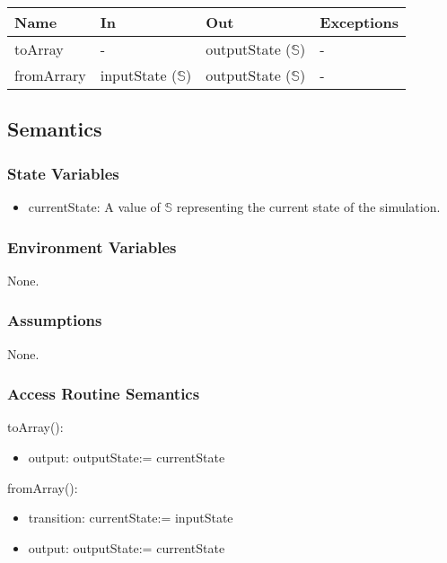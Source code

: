 \documentclass[12pt, titlepage]{article}
\begin{document}
\begin{center}
\begin{tabular}{p{2cm} p{4cm} p{4cm} p{2cm}}
\hline
\textbf{Name} & \textbf{In} & \textbf{Out} & \textbf{Exceptions} \\
\hline
toArray & - & outputState ($\mathbb{S}$) & - \\
fromArrary & inputState ($\mathbb{S}$) & outputState ($\mathbb{S}$) & - \\
\hline
\end{tabular}
\end{center}

\subsection{Semantics}

\subsubsection{State Variables}

\begin{itemize}
  \item currentState: A value of $\mathbb{S}$ representing the current state of the simulation.
\end{itemize}

\subsubsection{Environment Variables}

None.

\subsubsection{Assumptions}

None.

\subsubsection{Access Routine Semantics}

\noindent toArray():
\begin{itemize}
\item output: outputState:= currentState
\end{itemize}

\noindent fromArray():
\begin{itemize}
\item transition: currentState:= inputState
\item output: outputState:= currentState
\end{itemize}
\end{document}
